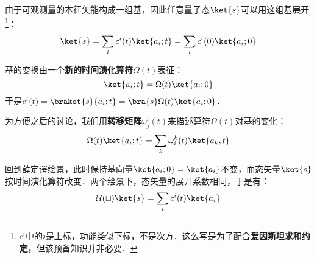 由于可观测量的本征矢能构成一组基，因此任意量子态$\ket{s}$可以用这组基展开\footnote{$c^i$中的$i$是上标，功能类似下标，不是次方．这么写是为了配合\textbf{爱因斯坦求和约定}，但该预备知识并非必要．}：
\begin{equation}\label{HsbPic_eq12}
\ket{s} = \sum_i c^i(t)\ket{a_i; t} = \sum_i c^i(0)\ket{a_i; 0}
\end{equation}


基的变换由一个\textbf{新的时间演化算符}$\Omega(t)$表征：
\begin{equation}\label{HsbPic_eq13}
\ket{a_i; t} = \Omega(t)\ket{a_i; 0}
\end{equation}
于是$c^i(t)=\braket{s}{a_i; t}=\bra{s}\Omega(t)\ket{a_i; 0}$．

为方便之后的讨论，我们用\textbf{转移矩阵}$\omega^i_j(t)$来描述算符$\Omega(t)$对基的变化：
\begin{equation}
\Omega(t)\ket{a_i; t} = \sum_k\omega^k_i(t)\ket{a_k, t}
\end{equation}


回到薛定谔绘景，此时保持基向量$\ket{a_i; 0}=\ket{a_i}$不变，而态矢量$\ket{s}$按时间演化算符改变．两个绘景下，态矢量的展开系数相同，于是有：
\begin{equation}\label{HsbPic_eq14}
\mathcal{U(t)}\ket{s} = \sum_i c^i(t) \ket{a_i}
\end{equation}












